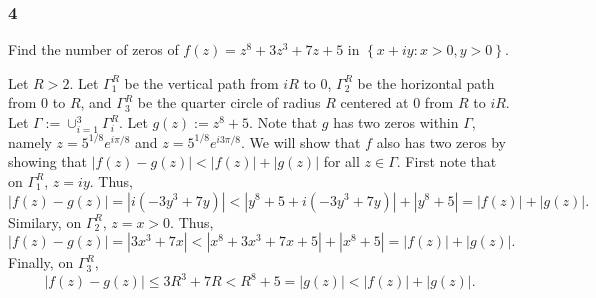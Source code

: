 \documentclass[12pt]{article}
\begin{document}
\subsubsection*{4}
\begin{tcolorbox}
  Find the number of zeros of $f(z) = z^8 + 3z^3 + 7z + 5$ in $\left\{ x + iy : x > 0, y > 0 \right\}$.
\end{tcolorbox}
Let $R > 2$. Let $\Gamma_{1}^{R}$ be the vertical path from $iR$ to $0$, $\Gamma_{2}^{R}$ be the horizontal path from $0$ to $R$, and $\Gamma_{3}^{R}$
be the quarter circle of radius $R$ centered at $0$ from $R$ to $iR$. Let $\Gamma := \cup_{i=1}^{3}\Gamma_{i}^{R}$.
Let $g(z) := z^{8} + 5$. Note that $g$ has two zeros within $\Gamma$, namely $z = 5^{1/8}e^{i\pi/8}$ and $z = 5^{1/8}e^{i3\pi/8}$. We will show that
$f$ also has two zeros by showing that $|f(z) - g(z)| < |f(z)| + |g(z)|$ for all $z \in \Gamma$. First note that on $\Gamma_{1}^{R}$, $z = iy$. Thus,
\[ |f(z) - g(z)| = |i(-3y^{3} + 7y)| < |y^{8} + 5 + i(-3y^{3} + 7y)| + |y^{8} + 5| = |f(z)| + |g(z)|. \]
Similary, on $\Gamma_{2}^{R}$, $z = x > 0$. Thus,
\[ |f(z) - g(z)| = |3x^{3} + 7x| < |x^{8} + 3x^{3} + 7x + 5| + |x^{8} + 5| = |f(z)| + |g(z)|. \]
Finally, on $\Gamma_{3}^{R}$,
\[ |f(z) - g(z)| \leq 3R^{3} + 7R < R^{8} + 5 = |g(z)| < |f(z)| + |g(z)|. \]



\newpage
\end{document}
